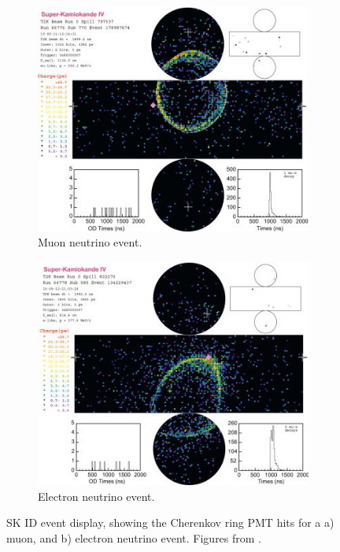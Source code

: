 \begin{figure}
\centering
\begin{subfigure}{.5\textwidth}
  \centering
  \includegraphics[width=0.95\linewidth]{figs/skeventdisplayelectron}
  \caption{Muon neutrino event.}
  \label{fig:skeventdisplayelectron}
\end{subfigure}%
\begin{subfigure}{.5\textwidth}
  \centering
  \includegraphics[width=0.95\linewidth]{figs/skeventdisplaymuon}
  \caption{Electron neutrino event.}
  \label{fig:skeventdisplaymuon}
\end{subfigure}
\caption{SK ID event display, showing the Cherenkov ring PMT hits for a a) muon, and b) electron neutrino event. Figures from \cite{tript}.}
\label{fig:skeventdisplay}
\end{figure}

